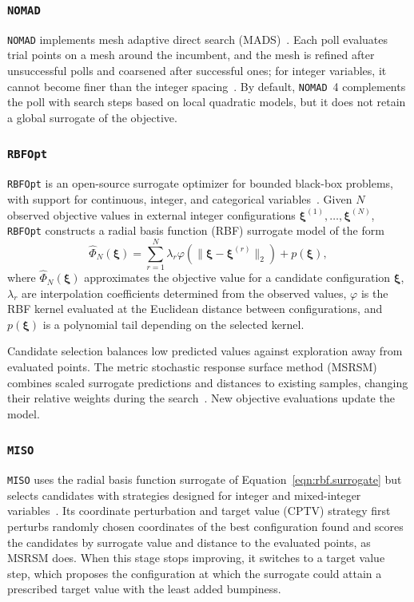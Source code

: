 \documentclass{article}
\begin{document}
\subsubsection{\texttt{NOMAD}}
\texttt{NOMAD} implements mesh adaptive direct search (MADS)~\citep{audet2022nomad}.
Each poll evaluates trial points on a mesh around the incumbent, and the mesh is refined after unsuccessful polls and coarsened after successful ones; for integer variables, it cannot become finer than the integer spacing~\citep{abramson2009mads}.
By default, \texttt{NOMAD}~4 complements the poll with search steps based on local quadratic models, but it does not retain a global surrogate of the objective.

\subsubsection{\texttt{RBFOpt}}
\texttt{RBFOpt} is an open-source surrogate optimizer for bounded black-box problems, with support for continuous, integer, and categorical variables~\citep{costa2018rbfopt,nannicini2021implementation}.
Given \(N\) observed objective values in external integer configurations \(\boldsymbol\xi^{(1)},\ldots,\boldsymbol\xi^{(N)}\), \texttt{RBFOpt} constructs a radial basis function (RBF) surrogate model of the form
\begin{equation}\label{eqn:rbf.surrogate}
\widehat\Phi_N(\boldsymbol\xi)
=\sum_{r=1}^{N}\lambda_r\varphi\!\left(\|\boldsymbol\xi-\boldsymbol\xi^{(r)}\|_2\right)
+p(\boldsymbol\xi),
\end{equation}
where \(\widehat\Phi_N(\boldsymbol\xi)\) approximates the objective value for a candidate configuration \(\boldsymbol\xi\), \(\lambda_r\) are interpolation coefficients determined from the observed values, \(\varphi\) is the RBF kernel evaluated at the Euclidean distance between configurations, and \(p(\boldsymbol\xi)\) is a polynomial tail depending on the selected kernel.

Candidate selection balances low predicted values against exploration away from evaluated points.
The metric stochastic response surface method (MSRSM) combines scaled surrogate predictions and distances to existing samples, changing their relative weights during the search~\citep{regis2007stochastic}.
New objective evaluations update the model.

\subsubsection{\texttt{MISO}}
\texttt{MISO} uses the radial basis function surrogate of Equation~\eqref{eqn:rbf.surrogate} but selects candidates with strategies designed for integer and mixed-integer variables~\citep{muller2016miso}.
Its coordinate perturbation and target value (CPTV) strategy first perturbs randomly chosen coordinates of the best configuration found and scores the candidates by surrogate value and distance to the evaluated points, as MSRSM does.
When this stage stops improving, it switches to a target value step, which proposes the configuration at which the surrogate could attain a prescribed target value with the least added bumpiness.
\end{document}
